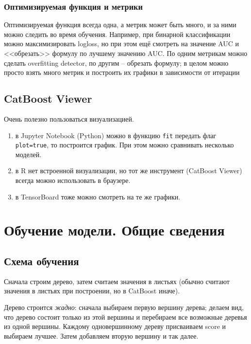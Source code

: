 \documentclass[a4paper,12pt]{article}
\begin{document}
\subsubsection{Оптимизируемая функция и метрики}

Оптимизируемая функция всегда одна, а метрик может быть много, и за ними можно следить во время обучения.
Например, при бинарной классификации можно максимизировать logloss, но при этом ещё смотреть на значение AUC и <<обрезать>> формулу по лучшему значению AUC.
По одним метрикам можно сделать overfitting detector, по другим -- обрезать формулу; в целом можно просто взять много метрик и построить их графики в зависимости от итерации

\subsection{CatBoost Viewer}

Очень полезно пользоваться визуализацией.
\begin{enumerate}[noitemsep]
    \item в Jupyter Notebook (Python) можно в функцию \texttt{fit} передать флаг \texttt{plot=true}, то построится график.
    При этом можно сравнивать несколько моделей.
    \item в R нет встроенной визуализации, но тот же инструмент (CatBoost Viewer) всегда можно использовать в браузере.
    \item в TensorBoard тоже можно смотреть на те же графики.
\end{enumerate}

\section{Обучение модели. Общие сведения}

\subsection{Схема обучения}

Сначала строим дерево, затем считаем значения в листьях (обычно считают значения в листьях при построении, но в CatBoost иначе).

Дерево строится \textit{жадно}: сначала выбираем первую вершину дерева; делаем вид, что дерево состоит только из этой вершины и перебираем все возможные деревья из одной вершины.
Каждому одновершинному дереву присваиваем score и выбираем лучшее.
Затем добавляем вторую вершину и так далее. \\
\end{document}

